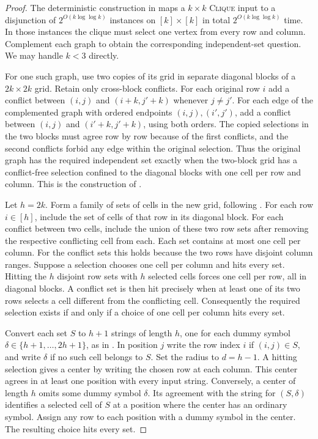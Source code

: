 \documentclass[11pt]{article}
\begin{document}
\begin{proof}
The deterministic construction in \cite[Corollary~2.6 and Lemma~2.8]{lms} maps a $k\times k$ \textsc{Clique} input to a disjunction of $2^{O(k\log\log k)}$ instances on $[k]\times[k]$ in total $2^{O(k\log\log k)}$ time. In those instances the clique must select one vertex from every row and column. Complement each graph to obtain the corresponding independent-set question. We may handle $k<3$ directly.

For one such graph, use two copies of its grid in separate diagonal blocks of a $2k\times 2k$ grid. Retain only cross-block conflicts. For each original row $i$ add a conflict between $(i,j)$ and $(i+k,j'+k)$ whenever $j\ne j'$. For each edge of the complemented graph with ordered endpoints $(i,j),(i',j')$, add a conflict between $(i,j)$ and $(i'+k,j'+k)$, using both orders. The copied selections in the two blocks must agree row by row because of the first conflicts, and the second conflicts forbid any edge within the original selection. Thus the original graph has the required independent set exactly when the two-block grid has a conflict-free selection confined to the diagonal blocks with one cell per row and column. This is the construction of \cite[Theorem~2.11]{lms}.

Let $h=2k$. Form a family of sets of cells in the new grid, following \cite[Theorem~2.12]{lms}. For each row $i\in[h]$, include the set of cells of that row in its diagonal block. For each conflict between two cells, include the union of these two row sets after removing the respective conflicting cell from each. Each set contains at most one cell per column. For the conflict sets this holds because the two rows have disjoint column ranges. Suppose a selection chooses one cell per column and hits every set. Hitting the $h$ disjoint row sets with $h$ selected cells forces one cell per row, all in diagonal blocks. A conflict set is then hit precisely when at least one of its two rows selects a cell different from the conflicting cell. Consequently the required selection exists if and only if a choice of one cell per column hits every set.

Convert each set $S$ to $h+1$ strings of length $h$, one for each dummy symbol $\delta\in\{h+1,\ldots,2h+1\}$, as in \cite[Theorem~3.1]{lms}. In position $j$ write the row index $i$ if $(i,j)\in S$, and write $\delta$ if no such cell belongs to $S$. Set the radius to $d=h-1$. A hitting selection gives a center by writing the chosen row at each column. This center agrees in at least one position with every input string. Conversely, a center of length $h$ omits some dummy symbol $\delta$. Its agreement with the string for $(S,\delta)$ identifies a selected cell of $S$ at a position where the center has an ordinary symbol. Assign any row to each position with a dummy symbol in the center. The resulting choice hits every set.


\end{proof}
\end{document}
